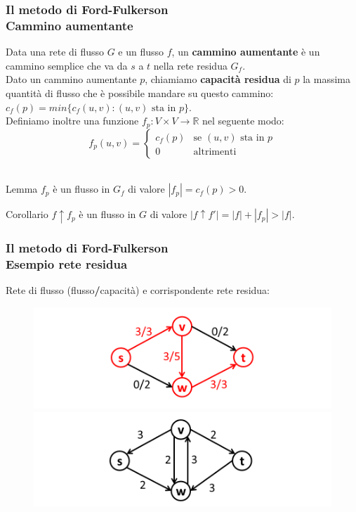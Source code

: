 \documentclass{beamer}
\begin{document}
\begin{frame}
\frametitle{Il metodo di Ford-Fulkerson\\Cammino aumentante}
Data una rete di flusso $G$ e un flusso $f$, un \textbf{cammino aumentante} è un cammino semplice che va da $s$ a $t$ nella rete residua $G_f$.\\
Dato un cammino aumentante $p$, chiamiamo \textbf{capacità residua} di $p$ la massima quantità di flusso che è possibile mandare su questo cammino:\\
$c_f(p)=min\{c_f(u,v):(u,v) \mbox{ sta in } p\}$.\\
Definiamo inoltre una funzione $f_p:V\times V\rightarrow \mathbb{R}$ nel seguente modo:\\
$$f_p(u,v) =
\left\{
	\begin{array}{ll}
		c_f(p) & \mbox{se } (u,v) \mbox{ sta in } p\\
		0 & \mbox{altrimenti}
	\end{array}
\right.$$\\
\begin{block}{Lemma}
$f_p$ è un flusso in $G_f$ di valore $|f_p|=c_f(p)>0$.
\end{block}
\begin{block}{Corollario}
$f\uparrow f_p$ è un flusso in $G$ di valore $|f\uparrow f'|=|f|+|f_p|>|f|.$
\end{block}
\end{frame}

\begin{frame}
\frametitle{Il metodo di Ford-Fulkerson\\Esempio rete residua}
Rete di flusso (flusso\textbf{/}capacità) e corrispondente rete residua:
\begin{figure}
\includegraphics[width=0.8\linewidth]{1.png}\\
\includegraphics[width=0.8\linewidth]{2.png}
\end{figure}
\end{frame}
\end{document}
